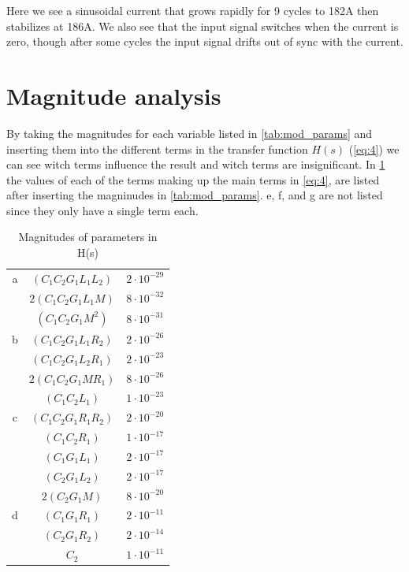Here we see a sinusoidal current that grows rapidly for 9 cycles to 182A then stabilizes at 186A. We also see that the input signal switches when the current is zero, though after some cycles the input signal drifts out of sync with the current.

\newpage
\section{Magnitude analysis}
By taking the magnitudes for each variable listed in \cref{tab:mod_params} and inserting them into the different terms in the transfer function $H(s)$ (\cref{eq:4}) we can see witch terms influence the result and witch terms are insignificant. In \cref{tab:termsh} the values of each of the terms making up the main terms in \cref{eq:4}, are listed after inserting the magninudes in \cref{tab:mod_params}. e, f, and g are not listed since they only have a single term each.

\begin{table}[H]
    \centering
    \begin{tabular}{c|c|c}
        a & $(C_1 C_2 G_1 L_1 L_2)$   & $2 \cdot 10^{-29}$ \\
          & $2 (C_1 C_2 G_1 L_1 M)$   & $8 \cdot 10^{-32}$ \\
          & $(C_1 C_2 G_1 M^2)$       & $8 \cdot 10^{-31}$ \\
        \hline
        b & $(C_1 C_2 G_1 L_1 R_2)$   & $2 \cdot 10^{-26}$ \\
          & $(C_1 C_2 G_1 L_2 R_1)$   & $2 \cdot 10^{-23}$ \\
          & $2 (C_1 C_2 G_1 M R_1)$   & $8 \cdot 10^{-26}$ \\
          & $(C_1 C_2 L_1)$           & $1 \cdot 10^{-23}$ \\
        \hline
        c & $(C_1 C_2 G_1 R_1 R_2)$   & $2 \cdot 10^{-20}$ \\
          & $(C_1 C_2 R_1)$           & $1 \cdot 10^{-17}$ \\
          & $(C_1 G_1 L_1)$           & $2 \cdot 10^{-17}$ \\
          & $(C_2 G_1 L_2)$           & $2 \cdot 10^{-17}$ \\
          & $2 (C_2 G_1 M)$           & $8 \cdot 10^{-20}$ \\
        \hline
        d & $(C_1 G_1 R_1)$           & $2 \cdot 10^{-11}$ \\
          & $(C_2 G_1 R_2)$           & $2 \cdot 10^{-14}$ \\
          & $C_2$                     & $1 \cdot 10^{-11}$ \\
    \end{tabular}
    \caption{Magnitudes of parameters in H(s)}
    \label{tab:termsh}
\end{table}

